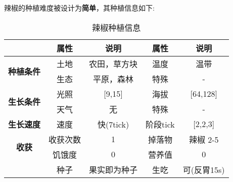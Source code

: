 辣椒的种植难度被设计为\textbf{简单}，其种植信息如下:

\begin{table}[H]
    \centering
    \caption{辣椒种植信息}
    \label{table:辣椒种植信息}
    \setlength{\tabcolsep}{4mm}
    \begin{tabular}{c|cc|cc}
        \toprule
                                           & \textbf{属性} & \textbf{说明} & \textbf{属性} & \textbf{说明} \\
        \midrule
        \multirow{2}{*}{\textbf{种植条件}} & 土地          & 农田，草方块  & 温度          & 温带          \\
                                           & 生态          & 平原，森林    & 特殊          & -             \\
        \midrule
        \multirow{2}{*}{\textbf{生长条件}} & 光照          & [9,15]        & 海拔          & [64,128]      \\
                                           & 天气          & 无            & 特殊          & -             \\
        \midrule
        \textbf{生长速度}                  & 速度          & 快(7tick)     & 阶段tick      & [2,2,3]       \\
        \midrule
        \multirow{2}{*}{\textbf{收获}}     & 收获次数      & 1             & 掉落物        & 辣椒 2-5      \\
                                           & 饥饿度        & 0             & 营养值        & 0             \\
                                           & 种子 & 果实即为种子 & 生吃 & 可(反胃15s) \\
        \bottomrule
    \end{tabular}
\end{table}

\newpage